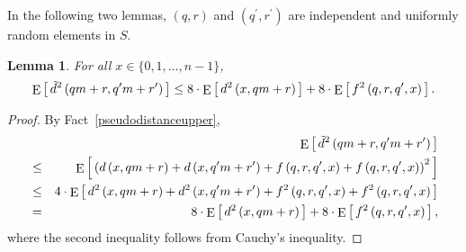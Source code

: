 \documentclass[letterpaper,12pt]{article}
\newtheorem{lemma}[theorem]{Lemma}
\begin{document}
{{In the following two lemmas,
$(q,r)$ and $(q^\prime,r^\prime)$ are
independent and uniformly random elements in $S$.

\begin{lemma}\label{distancessquareexpected}
For all $x\in\{0,1,\ldots,n-1\}$,
\begin{eqnarray*}
\mathop{\rm E}\left[\,{\tilde{d}}^2\left(qm+r,q^\prime m+r^\prime\right)\,\right]
\le 8\cdot\mathop{\rm E}\left[\,d^2\left(x,qm+r\right)\,\right]
+8\cdot\mathop{\rm E}\left[\,f^2\left(q,r,q^\prime,x\right)\,\right].
\end{eqnarray*}
\end{lemma}
\begin{proof}
By Fact~\ref{pseudodistanceupper},
\begin{eqnarray*}
&&\mathop{\rm E}\left[\,{\tilde{d}}^2\left(qm+r,q^\prime
m+r^\prime\right)\,\right]\\
&\le&
\mathop{\rm E}\left[\,\left(
d\left(x,qm+r\right)+d\left(x,q^\prime m+r^\prime\right)
+f\left(q,r,q^\prime,x\right)+f\left(q,r,q^\prime,x\right)
\right)^2\,\right]\\
&\le&
4\cdot \mathop{\rm E}\left[\,
d^2\left(x,qm+r\right)+d^2\left(x,q^\prime m+r^\prime\right)
+f^2\left(q,r,q^\prime,x\right)+f^2\left(q,r,q^\prime,x\right)
\,\right]\\
&=&8\cdot\mathop{\rm E}\left[\,d^2\left(x,qm+r\right)\,\right]
+8\cdot\mathop{\rm E}\left[\,f^2\left(q,r,q^\prime,x\right)\,\right],
\end{eqnarray*}
where the second inequality follows from Cauchy's inequality.
\end{proof}

}}
\end{document}
